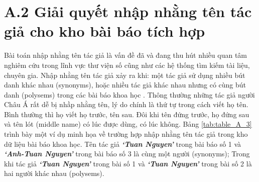 \section*{A.2 Giải quyết nhập nhằng tên tác giả cho kho bài báo tích hợp}
Bài toán nhập nhằng tên tác giả là vấn đề đã và đang thu hút nhiều quan tâm nghiêm cứu trong lĩnh vực thư viện số cũng như các hệ thống tìm kiếm tài liệu, chuyên gia. Nhập nhằng tên tác giả xảy ra khi: một tác giả sử dụng nhiều bút danh khác nhau (synonyms), hoặc nhiều tác giả khác nhau nhưng có cùng bút danh (polysems) trong các bài báo khoa học \cite{Ferreira:2012:BSA:2350036.2350040}. Thông thường những tác giả người Châu Á rất dễ bị nhầp nhằng tên, lý do chính là thứ tự trong cách viết họ tên. Bình thường thì họ viết họ trước, tên sau. Đôi khi tên đứng trước, họ đứng sau và tên lót (middle name) có lúc được dùng, có lúc không.
Bảng \ref{tab:table_A_3} trình bày một ví dụ minh họa về trường hợp nhập nhằng tên tác giả trong kho dữ liệu bài báo khoa học. Tên tác giả \textbf{\textit{`Tuan Nguyen'}} trong bài báo số 1 và \textbf{\textit{`Anh-Tuan Nguyen'}} trong bài báo số 3 là cùng một người (synonyms); Trong khi tác giả \textbf{\textit{`Tuan Nguyen'}} trong bài số 1 và \textbf{\textit{`Tuan Nguyen'}} trong bài số 2 là hai người khác nhau (polysems). 
